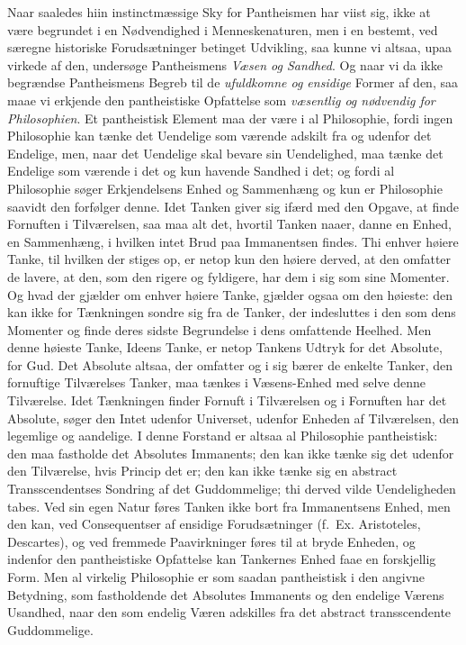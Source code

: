 Naar saaledes hiin instinctmæssige Sky for Pantheismen har viist sig, ikke at
være begrundet i en Nødvendighed i Menneskenaturen, men i en bestemt, ved
særegne historiske Forudsætninger betinget Udvikling, saa kunne vi altsaa,
upaa\-%
virkede af den, undersøge Pantheismens \emph{Væsen og Sandhed}. Og naar vi da
ikke begrændse Pantheismens Begreb til de \emph{ufuldkomne og ensidige} Former
af den, saa maae vi erkjende den pantheistiske Opfattelse som \emph{væsentlig
og nødvendig for Philosophien}. Et pantheistisk Element maa der være i al
Philosophie, fordi ingen Philosophie kan tænke det Uendelige som værende
adskilt fra og udenfor det Endelige, men, naar det Uendelige skal bevare sin
Uendelighed, maa tænke det Endelige som værende i det og kun havende Sandhed i
det; og fordi al Philosophie søger Erkjendelsens Enhed og Sammenhæng og kun er
Philosophie saavidt den forfølger denne. Idet Tanken giver sig ifærd med den
Opgave, at finde Fornuften i Tilværelsen, saa maa alt det, hvortil Tanken
naaer, danne en Enhed, en Sammenhæng, i hvilken intet Brud paa Immanentsen
findes. Thi enhver høiere Tanke, til hvilken der stiges op, er netop kun den
høiere derved, at den omfatter de lavere, at den, som den rigere og fyldigere,
har dem i sig som sine Momenter. Og hvad der gjælder om enhver høiere Tanke,
gjælder ogsaa om den høieste: den kan ikke for Tænkningen sondre sig fra de
Tanker, der indesluttes i den som dens Momenter og finde deres sidste
Begrundelse i dens omfattende Heelhed. Men denne høieste Tanke, Ideens Tanke,
er netop Tankens Udtryk for det Absolute, for Gud. Det Absolute altsaa, der
omfatter og i sig bærer de enkelte Tanker, den fornuftige Tilværelses Tanker,
maa tænkes i Væsens-Enhed med selve denne Tilværelse. Idet Tænkningen finder
Fornuft i Tilværelsen og i Fornuften har det Absolute, søger den Intet udenfor
Universet, udenfor Enheden af Tilværelsen, den legemlige og aandelige. I denne
Forstand er altsaa al Philosophie pantheistisk: den maa fastholde det Absolutes
Immanents; den kan ikke tænke sig det udenfor den Tilværelse, hvis Princip det
er; den kan ikke tænke sig en abstract Transscendentses Sondring af det
Guddommelige; thi derved vilde Uendeligheden tabes. Ved sin egen Natur føres
Tanken ikke bort fra Immanentsens Enhed, men den kan, ved Consequentser af
ensidige Forudsætninger (f.\ Ex.
 Aristoteles, Descartes), og ved fremmede Paavirkninger føres til at bryde
Enheden, og indenfor den pantheistiske Opfattelse kan Tankernes Enhed faae en
forskjellig Form. Men al virkelig Philosophie er som saadan pantheistisk i den
angivne Betydning, som fastholdende det Absolutes Immanents og den endelige
Værens Usandhed, naar den som endelig Væren adskilles fra det abstract
transscendente Guddommelige.

